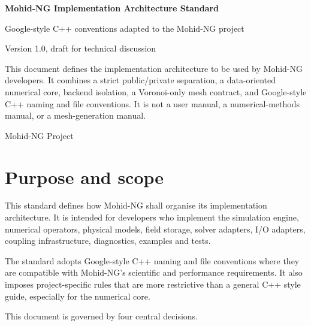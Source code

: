 \documentclass[11pt,a4paper]{article}
\begin{document}
\begin{titlepage}
\pagecolor{mohidlight}
\centering
\vspace*{2.0cm}
{\Huge\bfseries\color{mohidblue} Mohid-NG Implementation Architecture Standard\par}
\vspace{0.6cm}
{\Large Google-style C++ conventions adapted to the Mohid-NG project\par}
\vspace{1.4cm}
{\large Version 1.0, draft for technical discussion\par}
\vfill
\begin{minipage}{0.82\textwidth}
\small
This document defines the implementation architecture to be used by Mohid-NG developers. It combines a strict public/private separation, a data-oriented numerical core, backend isolation, a Voronoi-only mesh contract, and Google-style C++ naming and file conventions. It is not a user manual, a numerical-methods manual, or a mesh-generation manual.
\end{minipage}
\vfill
{\large Mohid-NG Project\par}
\vspace*{1.0cm}
\end{titlepage}
\nopagecolor
{}
\setcounter{page}{1}

\tableofcontents
\newpage

\section{Purpose and scope}

This standard defines how Mohid-NG shall organise its implementation architecture. It is intended for developers who implement the simulation engine, numerical operators, physical models, field storage, solver adapters, I/O adapters, coupling infrastructure, diagnostics, examples and tests.

The standard adopts Google-style C++ naming and file conventions where they are compatible with Mohid-NG's scientific and performance requirements. It also imposes project-specific rules that are more restrictive than a general C++ style guide, especially for the numerical core.

This document is governed by four central decisions.
\end{document}
